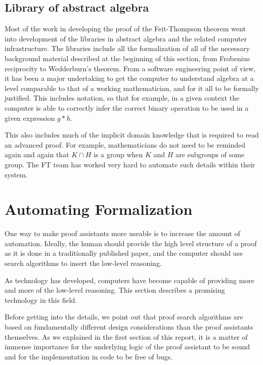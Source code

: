 \documentclass[brochure,english,12pt]{bourbaki}
\theoremstyle{plain}
\begin{document}
\subsection{Library of abstract algebra}

Most of the work in developing the proof of the Feit-Thompson theorem went into development of the libraries in
abstract algebra and the related computer infrastructure.  The libraries include all the formalization of all
of the necessary background material described at the beginning of this section, from Frobenius reciprocity
 to Wedderburn's theorem.  From a software engineering point of view, it has
been a major undertaking to get the computer to understand algebra at a level
comparable to that of a working mathematician, and for it all to be formally
justified.  This includes notation, so that for example,  in a 
given context the computer is able to correctly infer the correct binary operation 
to be used in a given expression $g*h$.  

This also includes much of the implicit domain knowledge that is required to
read an advanced proof.
For example, mathematicians do not need to be reminded again and again that $K \cap H$ is a group when
$K$ and $H$ are subgroups of some group.  The FT team has worked very hard
to automate such details within their system.



\section{Automating Formalization}

One way to make proof assistants more useable is to increase the amount of
automation.   Ideally, the human should provide the high level structure of a proof
as it is done in a traditionally published paper, and the computer should use
search algorithms to insert the low-level reasoning.   

As technology has developed, computers have become capable of providing
more and more of the low-level reasoning.   This section describes a 
 promising technology in this field.

Before getting into the details, we point out that proof search algorithms
are based on fundamentally different design considerations than the proof
assistants themselves.  As we explained in the first section of this report, it is a matter of
immense importance for the underlying logic of the proof assistant to be sound
and for the implementation in code to be free of bugs.  
\end{document}

